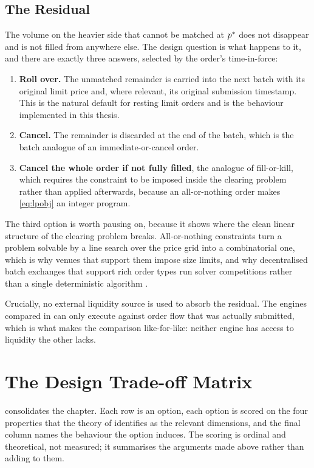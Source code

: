 \subsection{The Residual}

The volume on the heavier side that cannot be matched at $p^{\ast}$ does not
disappear and is not filled from anywhere else. The design question is
what happens to it, and there are exactly three answers, selected by the
order's time-in-force:

\begin{enumerate}
  \item \textbf{Roll over.} The unmatched remainder is carried into the
  next batch with its original limit price and, where relevant, its
  original submission timestamp. This is the natural default for
  resting limit orders and is the behaviour implemented in this thesis.
  \item \textbf{Cancel.} The remainder is discarded at the end of the
  batch, which is the batch analogue of an immediate-or-cancel order.
  \item \textbf{Cancel the whole order if not fully filled}, the analogue
  of fill-or-kill, which requires the constraint to be imposed inside
  the clearing problem rather than applied afterwards, because an
  all-or-nothing order makes \eqref{eq:lpobj} an integer program.
\end{enumerate}

The third option is worth pausing on, because it shows where the clean
linear structure of the clearing problem breaks. All-or-nothing
constraints turn a problem solvable by a line search over the price grid
into a combinatorial one, which is why venues that support them impose
size limits, and why decentralised batch exchanges that support rich
order types run solver competitions rather than a single deterministic
algorithm \citep{harrison2025hybrid}.

Crucially, no external liquidity source is used to absorb the residual.
The engines compared in  can only execute against
order flow that was actually submitted, which is what makes the
comparison like-for-like: neither engine has access to liquidity the
other lacks.

\section{The Design Trade-off Matrix}
\label{sec:tradeoff}

 consolidates the chapter. Each row is an option,
each option is scored on the four properties that the theory of
 identifies as the relevant dimensions, and the
final column names the behaviour the option induces. The scoring is
ordinal and theoretical, not measured; it summarises the arguments made
above rather than adding to them.

